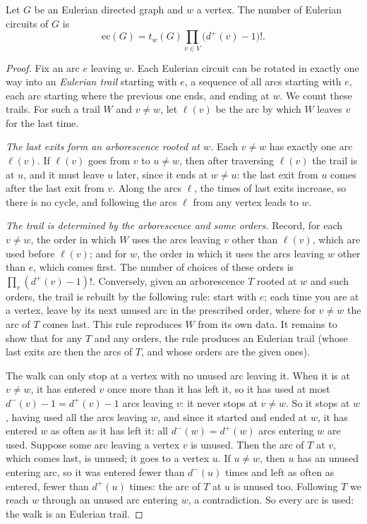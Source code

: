 \begin{theorem}\label{thm:best}
Let $G$ be an Eulerian directed graph and $w$ a vertex. The number of Eulerian circuits of $G$ is
\[
\mathrm{ec}(G)=t_w(G)\prod_{v\in V}\bigl(d^+(v)-1\bigr)!.
\]
\end{theorem}
\begin{proof}
Fix an arc $e$ leaving $w$. Each Eulerian circuit can be rotated in exactly one way into an \emph{Eulerian trail} starting with $e$, a sequence of all arcs starting with $e$, each arc
starting where the previous one ends, and ending at $w$. We count these trails. For such a trail $W$ and $v\ne w$, let $\ell(v)$ be the arc by which $W$ leaves $v$ for the last time.

\emph{The last exits form an arborescence rooted at $w$.} Each $v\ne w$ has exactly one arc $\ell(v)$. If $\ell(v)$ goes from $v$ to $u\ne w$, then after traversing $\ell(v)$ the trail is at $u$, and it
must leave $u$ later, since it ends at $w\ne u$: the last exit from $u$ comes after the last exit from $v$. Along the arcs $\ell$, the times of last exits increase, so there is no cycle, and
following the arcs $\ell$ from any vertex leads to $w$.

\emph{The trail is determined by the arborescence and some orders.} Record, for each $v\ne w$, the order in which $W$ uses the arcs leaving $v$ other than $\ell(v)$, which are used before
$\ell(v)$; and for $w$, the order in which it uses the arcs leaving $w$ other than $e$, which comes first. The number of choices of these orders is $\prod_v(d^+(v)-1)!$. Conversely, given an
arborescence $T$ rooted at $w$ and such orders, the trail is rebuilt by the following rule: start with $e$; each time you are at a vertex, leave by its next unused arc in the prescribed
order, where for $v\ne w$ the arc of $T$ comes last. This rule reproduces $W$ from its own data. It remains to show that for any $T$ and any orders, the rule produces an Eulerian trail
(whose last exits are then the arcs of $T$, and whose orders are the given ones).

The walk can only stop at a vertex with no unused arc leaving it. When it is at $v\ne w$, it has entered $v$ once more than it has left it, so it has used at most $d^-(v)-1=d^+(v)-1$ arcs leaving $v$:
it never stops at $v\ne w$. So it stops at $w$, having used all the arcs leaving $w$, and since it started and ended at $w$, it has entered $w$ as often as it has left it: all $d^-(w)=d^+(w)$ arcs
entering $w$ are used. Suppose some arc leaving a vertex $v$ is unused. Then the arc of $T$ at $v$, which comes last, is unused; it goes to a vertex $u$. If $u\ne w$, then $u$ has an unused entering arc,
so it was entered fewer than $d^-(u)$ times and left as often as entered, fewer than $d^+(u)$ times: the arc of $T$ at $u$ is unused too. Following $T$ we reach $w$ through an unused arc entering $w$,
a contradiction. So every arc is used: the walk is an Eulerian trail.
\end{proof}

